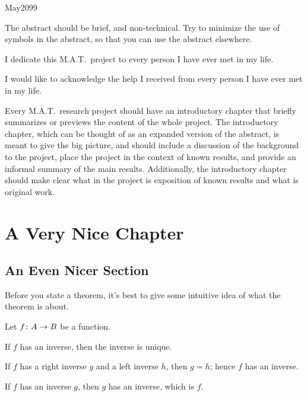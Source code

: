 \documentclass[11pt, twoside, reqno]{book}
\begin{document}
    {May}{2099}

\abstr

The abstract should be brief, and non-technical.  Try to minimize the use of symbols in the abstract, so that you can use the abstract elsewhere.

\tableofcontents

\dedic

I dedicate this M.A.T.\ project to every person I have ever met in my life.

\acknowl

I would like to acknowledge the help I received from every person I have ever met in my life.

\startmain


\intro

Every M.A.T.\ research project should have an introductory chapter that briefly summarizes or previews the content of the whole project.  The introductory chapter, which can be thought of as an expanded version of the abstract, is meant to give the big picture, and should include a discussion of the background to the project, place the project in the context of known results, and provide an informal summary of the main results.  Additionally, the introductory chapter should make clear what in the project is exposition of known results and what is original work.


\chapter{A Very Nice Chapter}
\label{chapA}

\section{An Even Nicer Section}
\label{secA1}

Before you state a theorem, it's best to give some intuitive idea of what the theorem is about.

\thm\label{thmAA} 
Let ${f} \colon {A} \to {B}$ be a function.
%
\enum 
\item\label{thmAA1}
If $f$ has an inverse, then the inverse is unique.
%
\item\label{thmAA2}
If $f$ has a right inverse $g$ and a left inverse $h$, then $g = h$; hence $f$ has an inverse.
%
\item\label{thmAA3}
If $f$ has an inverse $g$, then $g$ has an inverse, which is $f$.
\eenum
\ethm
 
\end{document}
